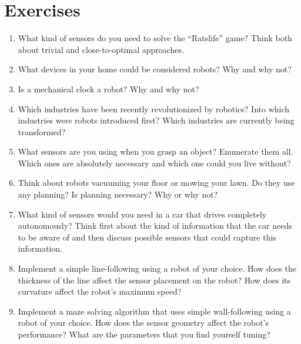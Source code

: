 \section*{Exercises}\small
\begin{enumerate}
\item What kind of sensors do you need to solve the ``Ratslife'' game? Think both about trivial and close-to-optimal approaches.
\item What devices in your home could be considered robots? Why and why not?
\item Is a mechanical clock a robot? Why and why not?
\item Which industries have been recently revolutionized by robotics? Into which industries were robots introduced first? Which industries are currently being transformed?
\item What sensors are you using when you grasp an object? Enumerate them all. Which ones are absolutely necessary and which one could you live without?
\item Think about robots vacuuming your floor or mowing your lawn. Do they use any planning? Is planning necessary? Why or why not?
\item What kind of sensors would you need in a car that drives completely autonomously? Think first about the kind of information that the car needs to be aware of and then discuss possible sensors that could capture this information.
\item Implement a simple line-following using a robot of your choice. How does the thickness of the line affect the sensor placement on the robot? How does its curvature affect the robot's maximum speed?
\item Implement a maze solving algorithm that uses simple wall-following using a robot of your choice. How does the sensor geometry affect the robot's performance? What are the parameters that you find yourself tuning?
\end{enumerate}\normalsize

